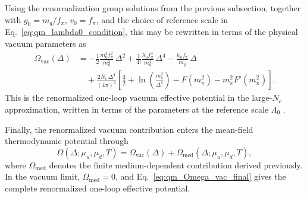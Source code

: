 Using the renormalization group solutions from the previous subsection,
together with \(g_0=m_q/f_\pi\), \(v_0=f_\pi\), and the choice of
reference scale in Eq.~\eqref{eq:qm_lambda0_condition}, this may be
rewritten in terms of the physical vacuum parameters as
\begin{align}
\Omega_{\mathrm{vac}}(\Delta)
&=
-\frac{1}{2}\frac{m_0^2 f_\pi^2}{m_q^2}\,\Delta^2
+
\frac{1}{4!}\frac{\lambda_0 f_\pi^4}{m_q^4}\,\Delta^4
-
\frac{h_0 f_\pi}{m_q}\,\Delta
\nonumber\\
&\quad
+
\frac{2N_c\,\Delta^4}{(4\pi)^2}
\left[
\frac{3}{2}
+
\ln\!\left(\frac{m_q^2}{\Delta^2}\right)
-
F(m_\pi^2)
-
m_\pi^2 F'(m_\pi^2)
\right].
\label{eq:qm_Omega_vac_final}
\end{align}
This is the renormalized one-loop vacuum effective potential in the
large-\(N_c\) approximation, written in terms of the parameters at the
reference scale \(\Lambda_0\) \cite{Folkestad2018}.

Finally, the renormalized vacuum contribution enters the mean-field
thermodynamic potential through
\begin{equation}
\Omega(\Delta;\mu_u,\mu_d,T)
=
\Omega_{\mathrm{vac}}(\Delta)
+
\Omega_{\mathrm{med}}(\Delta;\mu_u,\mu_d,T),
\label{eq:qm_full_potential_final}
\end{equation}
where \(\Omega_{\mathrm{med}}\) denotes the finite medium-dependent
contribution derived previously. In the vacuum limit,
\(\Omega_{\mathrm{med}}=0\), and
Eq.~\eqref{eq:qm_Omega_vac_final} gives the complete renormalized
one-loop effective potential.
